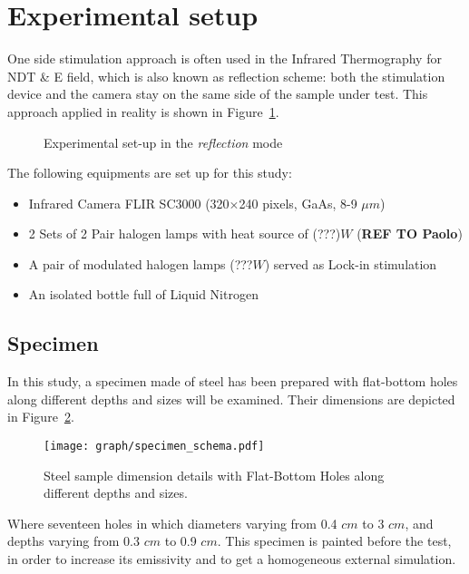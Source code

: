 \documentclass[]{spie}  %
\begin{document}
\section{Experimental setup} %
\label{sec:experimental_setup}
One side stimulation approach is often used in the Infrared Thermography for NDT \& E field, which is also known as reflection scheme: both the stimulation device and the camera stay on the same side of the sample under test. This approach applied in reality is shown in Figure~\ref{Exp_setup}.

\begin{figure}[ht]
   \centering
   \caption{Experimental set-up in the \textit{reflection} mode}
   \label{Exp_setup}
\end{figure}

The following equipments are set up for this study:
\begin{itemize}
   \item Infrared Camera FLIR SC3000 (320$\times$240 pixels, GaAs, 8-9 $\mu m$)
   \item 2 Sets of 2 Pair halogen lamps with heat source of (???)$W$ (\textbf{REF TO Paolo})
   \item A pair of modulated halogen lamps (???$W$) served as Lock-in stimulation
   \item An isolated bottle full of Liquid Nitrogen
\end{itemize}

\subsection{Specimen} %
\label{sub:specimen}
In this study, a specimen made of steel has been prepared with flat-bottom holes along different depths and sizes will be examined. Their dimensions are depicted in Figure~\ref{specimen}.
   \begin{figure}[ht]
   \centering   
   \texttt{[image: graph/specimen\_schema.pdf]}
   \caption{Steel sample dimension details with Flat-Bottom Holes along different depths and sizes.}
    \label{specimen} 
   \end{figure}  
Where seventeen holes in which diameters varying from 0.4 $cm$  to 3 $cm$, and depths varying from 0.3 $cm$ to 0.9 $cm$. This specimen is painted before the test, in order to increase its emissivity and to get a homogeneous external simulation.
\end{document}
